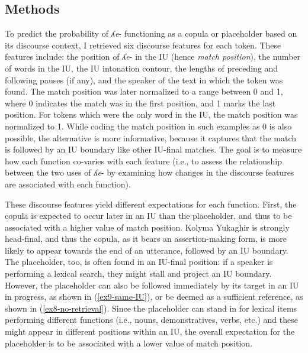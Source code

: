 \documentclass[output=paper,colorlinks,citecolor=brown
\ChapterDOI{10.5281/zenodo.15697581}
]{langscibook}
\begin{document}



\subsection{Methods}

To predict the probability of \textit{ʎe}- functioning as a copula or placeholder based on its discourse context, I retrieved six discourse features for each token. 
These features include: the position of \textit{ʎe}- in the IU (hence \textit{match position}), the number of words in the IU, the IU intonation contour, the lengths of preceding and following pauses (if any), and the speaker of the text in which the token was found.
The match position was later normalized to a range between 0 and 1, where 0 indicates the match was in the first position, and 1 marks the last position. 
For tokens which were the only word in the IU, the match position was normalized to 1. 
While coding the match position in such examples as 0 is also possible, the alternative is more informative, because it captures that the match is followed by an IU boundary like other IU-final matches.
The goal is to measure how each function co-varies with each feature (i.e., to assess the relationship between the two uses of \textit{ʎe}- by examining how changes in the discourse features are associated with each function). 

These discourse features yield different expectations for each function. 
First, the copula is expected to occur later in an IU than the placeholder, and thus to be associated with a higher value of match position. 
Kolyma Yukaghir is strongly head-final, and thus the copula, as it bears an assertion-making form, is more likely to appear towards the end of an utterance, followed by an IU boundary.
The placeholder, too, is often found in an IU-final position: if a speaker is performing a lexical search, they might stall and project an IU boundary.
However, the placeholder can also be followed immediately by its target in an IU in progress, as shown in (\ref{ex9-same-IU}), or be deemed as a sufficient reference, as shown in (\ref{ex8-no-retrieval}). 
Since the placeholder can stand in for lexical items performing different functions (i.e., nouns, demonstratives, verbs, etc.) and these might appear in different positions within an IU, the overall expectation for the placeholder is to be associated with a lower value of match position.
\end{document}
